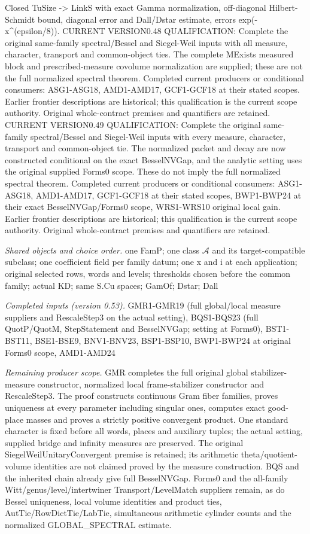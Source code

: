 \documentclass[11pt,a4paper]{article}
\numberwithin{equation}{section}
\theoremstyle{remark}\newtheorem{remark}[theorem]{Remark}
\begin{document}
Closed TuSize -> LinkS with exact Gamma normalization, off-diagonal Hilbert-Schmidt bound, diagonal error and Dall/Dstar estimate, errors exp(-x\textasciicircum{}(epsilon/8)). CURRENT VERSION0.48 QUALIFICATION: Complete the original same-family spectral/Bessel and Siegel-Weil inputs with all measure, character, transport and common-object ties. The complete MExists measured block and prescribed-measure covolume normalization are supplied; these are not the full normalized spectral theorem. Completed current producers or conditional consumers: ASG1-ASG18, AMD1-AMD17, GCF1-GCF18 at their stated scopes. Earlier frontier descriptions are historical; this qualification is the current scope authority. Original whole-contract premises and quantifiers are retained. CURRENT VERSION0.49 QUALIFICATION: Complete the original same-family spectral/Bessel and Siegel-Weil inputs with every measure, character, transport and common-object tie. The normalized packet and decay are now constructed conditional on the exact BesselNVGap, and the analytic setting uses the original supplied Forms0 scope. These do not imply the full normalized spectral theorem. Completed current producers or conditional consumers: ASG1-ASG18, AMD1-AMD17, GCF1-GCF18 at their stated scopes, BWP1-BWP24 at their exact BesselNVGap/Forms0 scope, WRS1-WRS10 original local gain. Earlier frontier descriptions are historical; this qualification is the current scope authority. Original whole-contract premises and quantifiers are retained.

\emph{Shared objects and choice order.} one FamP; one class $\mathcal A$ and its target-compatible subclass; one coefficient field per family datum; one x and i at each application; original selected rows, words and levels; thresholds chosen before the common family; actual KD; same S.Cu spaces; GamOf; Dstar; Dall

\emph{Completed inputs (version 0.53).} GMR1-GMR19 (full global/local measure suppliers and RescaleStep3 on the actual setting), BQS1-BQS23 (full QuotP/QuotM, StepStatement and BesselNVGap; setting at Forms0), BST1-BST11, BSE1-BSE9, BNV1-BNV23, BSP1-BSP10, BWP1-BWP24 at original Forms0 scope, AMD1-AMD24

\emph{Remaining producer scope.} GMR completes the full original global stabilizer-measure constructor, normalized local frame-stabilizer constructor and RescaleStep3. The proof constructs continuous Gram fiber families, proves uniqueness at every parameter including singular ones, computes exact good-place masses and proves a strictly positive convergent product. One standard character is fixed before all words, places and auxiliary tuples; the actual setting, supplied bridge and infinity measures are preserved. The original SiegelWeilUnitaryConvergent premise is retained; its arithmetic theta/quotient-volume identities are not claimed proved by the measure construction. BQS and the inherited chain already give full BesselNVGap. Forms0 and the all-family Witt/genus/level/intertwiner Transport/LevelMatch suppliers remain, as do Bessel uniqueness, local volume identities and product ties, AutTie/RowDictTie/LabTie, simultaneous arithmetic cylinder counts and the normalized GLOBAL\_\allowbreak SPECTRAL estimate.
\end{document}
